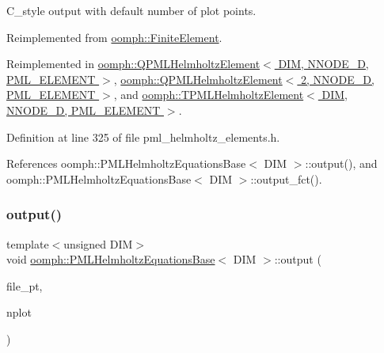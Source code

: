 C\+\_\+style output with default number of plot points. 



Reimplemented from \hyperlink{classoomph_1_1FiniteElement_a72cddd09f8ddbee1a20a1ff404c6943e}{oomph\+::\+Finite\+Element}.



Reimplemented in \hyperlink{classoomph_1_1QPMLHelmholtzElement_acafc9a4a72c78e17f7d90b16263a196c}{oomph\+::\+Q\+P\+M\+L\+Helmholtz\+Element$<$ D\+I\+M, N\+N\+O\+D\+E\+\_\+D, P\+M\+L\+\_\+\+E\+L\+E\+M\+E\+N\+T $>$}, \hyperlink{classoomph_1_1QPMLHelmholtzElement_acafc9a4a72c78e17f7d90b16263a196c}{oomph\+::\+Q\+P\+M\+L\+Helmholtz\+Element$<$ 2, N\+N\+O\+D\+E\+\_\+D, P\+M\+L\+\_\+\+E\+L\+E\+M\+E\+N\+T $>$}, and \hyperlink{classoomph_1_1TPMLHelmholtzElement_a71d5ae7a30f3f20a89fa20f5b84e2bef}{oomph\+::\+T\+P\+M\+L\+Helmholtz\+Element$<$ D\+I\+M, N\+N\+O\+D\+E\+\_\+D, P\+M\+L\+\_\+\+E\+L\+E\+M\+E\+N\+T $>$}.



Definition at line 325 of file pml\+\_\+helmholtz\+\_\+elements.\+h.



References oomph\+::\+P\+M\+L\+Helmholtz\+Equations\+Base$<$ D\+I\+M $>$\+::output(), and oomph\+::\+P\+M\+L\+Helmholtz\+Equations\+Base$<$ D\+I\+M $>$\+::output\+\_\+fct().

\mbox{\label{classoomph_1_1PMLHelmholtzEquationsBase_a2b5f6565c5fe24c2d01e630b33a46334}} 
\subsubsection{\texorpdfstring{output()}{output()}\hspace{0.1cm}{\footnotesize\ttfamily [4/4]}}
{\footnotesize\ttfamily template$<$unsigned D\+IM$>$ \\
void \hyperlink{classoomph_1_1PMLHelmholtzEquationsBase}{oomph\+::\+P\+M\+L\+Helmholtz\+Equations\+Base}$<$ D\+IM $>$\+::output (\begin{DoxyParamCaption}\item[{F\+I\+LE $\ast$}]{file\+\_\+pt,  }\item[{const unsigned \&}]{nplot }\end{DoxyParamCaption})\hspace{0.3cm}{\ttfamily [virtual]}}



